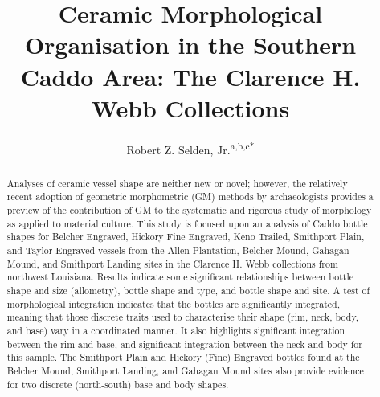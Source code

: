 \documentclass[review]{elsarticle}
\begin{document}
\begin{frontmatter}


\title{Ceramic Morphological Organisation in the Southern Caddo Area: The Clarence H. Webb Collections}



\author{Robert Z. Selden, Jr.\textsuperscript{a,b,c*}}
\address[1]{Center for Regional Heritage Research, Stephen F. Austin State University, US}
\address[2]{Cultural Heritage Department, Jean Monnet University, FR}
\address[3]{ORCID ID \href{http://orcid.org/0000-0002-1789-8449}{0000-0002-1789-8449}}

\begin{abstract}
Analyses of ceramic vessel shape are neither new or novel; however, the relatively recent adoption of geometric morphometric (GM) methods by archaeologists provides a preview of the contribution of GM to the systematic and rigorous study of morphology as applied to material culture. This study is focused upon an analysis of Caddo bottle shapes for Belcher Engraved, Hickory Fine Engraved, Keno Trailed, Smithport Plain, and Taylor Engraved vessels from the Allen Plantation, Belcher Mound, Gahagan Mound, and Smithport Landing sites in the Clarence H. Webb collections from northwest Louisiana. Results indicate some significant relationships between bottle shape and size (allometry), bottle shape and type, and bottle shape and site. A test of morphological integration indicates that the bottles are significantly integrated, meaning that those discrete traits used to characterise their shape (rim, neck, body, and base) vary in a coordinated manner. It also highlights significant integration between the rim and base, and significant integration between the neck and body for this sample. The Smithport Plain and Hickory (Fine) Engraved bottles found at the Belcher Mound, Smithport Landing, and Gahagan Mound sites also provide evidence for two discrete (north-south) base and body shapes.
\end{abstract}


\end{frontmatter}
\end{document}
